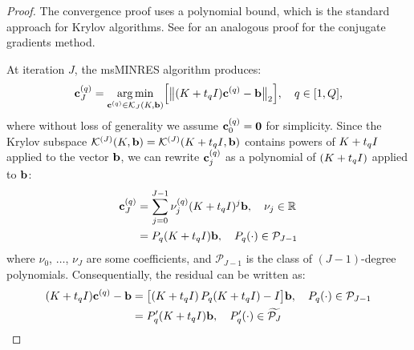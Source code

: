 \begin{proof}
  The convergence proof uses a polynomial bound, which is the standard approach for Krylov algorithms.
  See \citep[e.g.][]{shewchuk1994introduction,trefethen1997numerical,saad2003iterative} for an analogous proof for the conjugate gradients method.

	At iteration $J$, the msMINRES algorithm produces:
	\begin{align}
    \mathbf{c}^{(q)}_J
    = \operatorname*{arg\,min}_{\mathbf{c}^{(q)} \in \mathcal{K}_J(K, \mathbf{b})} \Bigl[
      \bigl\Vert (K + t_q I) \mathbf{c}^{(q)} - \mathbf{b} \bigr\Vert_2
    \Bigr],
    \quad
    q \in [1, Q],
    \label{eqn:minres_krylov}
	\end{align}
  where without loss of generality we assume $\mathbf{c}_0^{(q)} = \mathbf{0}$ for simplicity.
  Since the Krylov subspace $\mathcal{K}^{(J)} (K, \mathbf{b}) = \mathcal{K}^{(J)} (K + t_q I, \mathbf{b})$ contains powers of $K + t_q I$ applied to the vector $\mathbf{b}$, we can rewrite
  $\mathbf{c}_j^{(q)}$
  as a polynomial of $(K + t_q I)$ applied to $\mathbf{b}$:
  \begin{align*}
    \mathbf{c}^{(q)}_J
    &= \sum_{j=0}^{J-1} \nu_j^{(q)} (K + t_q I)^j \mathbf{b}, \quad \nu_j \in \mathbb{R}
    \\
    &= P_q(K + t_q I) \mathbf{b}, \quad P_q(\cdot) \in \mathcal{P}_{J-1}
  \end{align*}
  where $\nu_0$, $\ldots$, $\nu_J$ are some coefficients,
  and $\mathcal{P}_{J-1}$ is the class of $(J-1)$-degree polynomials.
  Consequentially, the residual can be written as:
  \begin{align}
    (K + t_q I) \mathbf{c}^{(q)} - \mathbf{b}
    &= \bigl[ \left( K + t_q I \right) P_q(K + t_q I) - I \bigr] \mathbf{b}, \quad P_q(\cdot) \in \mathcal{P}_{J-1}
    \nonumber
    \\
    &= P'_q(K + t_q I) \mathbf{b}, \quad P'_q(\cdot) \in \widetilde{\mathcal{P}_J}
    \nonumber
  \end{align}


\end{proof}
